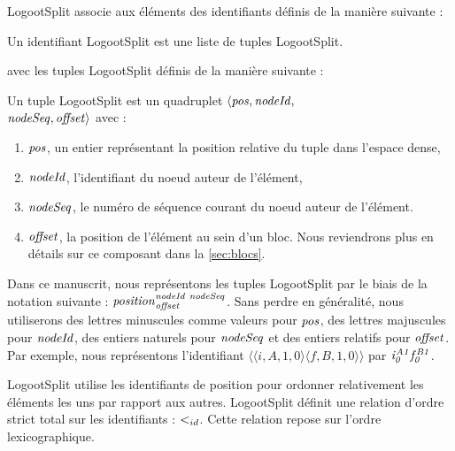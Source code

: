 LogootSplit associe aux éléments des identifiants définis de la manière suivante :

\begin{definition}
  Un identifiant LogootSplit est une liste de tuples LogootSplit.
\end{definition}
avec les tuples LogootSplit définis de la manière suivante :
\begin{definition}
  Un tuple LogootSplit est un quadruplet $\langle \mathit{pos},\mathit{nodeId},$ \\
  $\mathit{nodeSeq},\mathit{offset} \rangle$ avec :
  \begin{enumerate}
    \item $\mathit{pos}$, un entier représentant la position relative du tuple dans l'espace dense,
    \item $\mathit{nodeId}$, l'identifiant du noeud auteur de l'élément,
    \item $\mathit{nodeSeq}$, le numéro de séquence courant du noeud auteur de l'élément.
    \item $\mathit{offset}$, la position de l'élément au sein d'un bloc. Nous reviendrons plus en détails sur ce composant dans la \autoref{sec:blocs}.
  \end{enumerate}
\end{definition}

Dans ce manuscrit, nous représentons les tuples LogootSplit par le biais de la notation suivante : $\mathit{position}^{\mathit{nodeId~nodeSeq}}_{\mathit{offset}}$.
Sans perdre en généralité, nous utiliserons des lettres minuscules comme valeurs pour $\mathit{pos}$, des lettres majuscules pour $\mathit{nodeId}$, des entiers naturels pour $\mathit{nodeSeq}$ et des entiers relatifs pour $\mathit{offset}$.
Par exemple, nous représentons l'identifiant $\langle \langle i,A,1,0 \rangle \langle f,B,1,0 \rangle \rangle$ par $\mathit{i}^{\mathit{A1}}_{\mathit{0}}\mathit{f}^{\mathit{B1}}_{\mathit{0}}$.

LogootSplit utilise les identifiants de position pour ordonner relativement les éléments les uns par rapport aux autres.
LogootSplit définit une relation d'ordre strict total sur les identifiants : $<_{id}$.
Cette relation repose sur l'ordre lexicographique.

